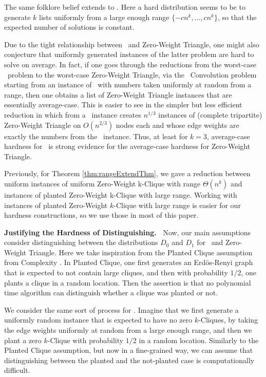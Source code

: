 The same folklore belief extends to \kSum. Here a hard distribution seems to be to generate $k$ lists uniformly from a large enough range $\{-cn^k,\ldots, cn^k\}$, so that the expected number of solutions is constant. 

Due to the tight relationship between \ThSum~and Zero-Weight Triangle, one might also conjecture that uniformly generated instances of the latter problem are hard to solve on average. In fact, if one goes through the reductions from the worst-case \ThSum~problem to the worst-case Zero-Weight Triangle, via the \ThSum~Convolution problem \cite{Patrascu10,WilliamsW13j} starting from an instance of \ThSum~with numbers taken uniformly at random from a range, then one obtains a list of Zero-Weight Triangle instances that are essentially average-case. This is easier to see in the simpler but less efficient reduction in \cite{WilliamsW13j} which from a \ThSum~instance creates $n^{1/3}$ instances of (complete tripartite) Zero-Weight Triangle on $O(n^{2/3})$ nodes each and whose edge weights are exactly the numbers from the \ThSum~instance. Thus, at least for $k=3$, average-case hardness for \ThSum~is strong evidence for the average-case hardness for Zero-Weight Triangle.

Previously, for Theorem \ref{thm:rangeExtendThm}, we gave a reduction between uniform instances of uniform Zero-Weight k-Clique with range $\Theta(n^k)$ and instances of planted Zero-Weight k-Clique with large range. Working with instances of planted Zero-Weight $k$-Clique with large range is easier for our hardness constructions, so we use those in most of this paper.  

\textbf{Justifying the Hardness of Distinguishing.~}
Now, our main assumptions consider distinguishing between the distributions $D_0$ and $D_1$ for
\ThSum~and Zero-Weight Triangle. Here we take inspiration from the Planted Clique assumption from Complexity \cite{HazanK11,Jerrum92,Kucera95}. In Planted Clique, one first generates an Erd\"os-Renyi graph that is expected to not contain large cliques, and then with probability $1/2$, one plants a clique in a random location. Then the assertion is that no polynomial time algorithm can distinguish whether a clique was planted or not.

We consider the same sort of process for \zkclique. Imagine that we first generate a uniformly random instance that is expected to have no zero $k$-Cliques, by taking the edge weights uniformly at random from a large enough range, and then we plant a zero $k$-Clique with probability $1/2$ in a random location. Similarly to the Planted Clique assumption, but now in a fine-grained way, we can assume that distinguishing between the planted and the not-planted case is computationally difficult.


